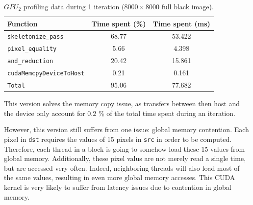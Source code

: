 \documentclass[11pt,a4paper]{article}
\begin{document}
                \begin{table}[ht]
                    \centering
                    \begin{tabular}{lcc}
                        \toprule
                        Function                      & Time spent (\%) & Time spent (ms) \\
                        \midrule
                        \verb+skeletonize_pass+       & 68.77           & 53.422          \\
                        \verb+pixel_equality+         & 5.66            & 4.398           \\
                        \verb+and_reduction+          & 20.42           & 15.861          \\
                        \verb+cudaMemcpyDeviceToHost+ & 0.21            & 0.161           \\
                        \midrule
                        \verb+Total+                  & 95.06           & 77.682          \\
                        \bottomrule
                    \end{tabular}
                    \caption{$GPU_{2}$ profiling data during 1 iteration ($8000 \times 8000$ full black image).}
                    \label{tab:black_gpu2_timing_diagram}
                \end{table}


                This version solves the memory copy issue, as transfers between then host and the device only account for 0.2 \% of the total time spent during an iteration.

                However, this version still suffers from one issue: global memory contention.
                Each pixel in \verb+dst+ requires the values of 15 pixels in \verb+src+ in order to be computed.
                Therefore, each thread in a block is going to somehow load these 15 values from global memory.
                Additionally, these pixel valus are not merely read a single time, but are accessed very often.
                Indeed, neighboring threads will also load most of the same values, resulting in even more global memory accesses.
                This CUDA kernel is very likely to suffer from latency issues due to contention in global memory.
\end{document}
